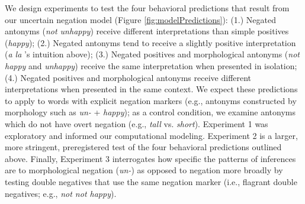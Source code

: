 \documentclass[floatsintext,doc]{apa6}
\begin{document}
We design experiments to test the four behavioral predictions that result from our uncertain negation model (Figure \ref{fig:modelPredictions}): (1.) Negated antonyms (\emph{not unhappy}) receive different interpretations than simple positives (\emph{happy}); (2.) Negated antonyms tend to receive a slightly positive interpretation (\emph{a la} 's intuition above); (3.) Negated positives and morphological antonyms (\emph{not happy} and \emph{unhappy}) receive the same interpretation when presented in isolation; (4.) Negated positives and morphological antonyms receive different interpretations when presented in the same context. 
We expect these predictions to apply to words with explicit negation markers (e.g., antonyms constructed by morphology such as \emph{un-} + \emph{happy}); as a control condition, we examine antonyms which do not have overt negation (e.g., \emph{tall} vs. \emph{short}).
Experiment 1 was exploratory and informed our computational modeling.
Experiment 2 is a larger, more stringent, preregistered test of the four behavioral predictions outlined above.
Finally, Experiment 3 interrogates how specific the patterns of inferences are to morphological negation (\emph{un-}) as opposed to negation more broadly by testing double negatives that use the same negation marker  (i.e., flagrant double negatives; e.g., \emph{not not happy}).
\end{document}

